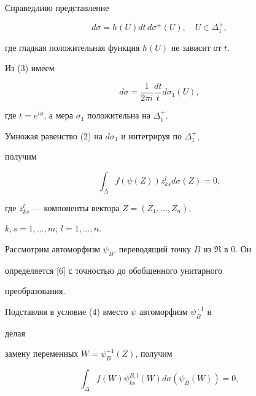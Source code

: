 \begin{lem} 


Справедливо представление 


\begin{equation} 


d\sigma=h(U)dt\,d\sigma^+(U),\quad U\in\Delta^+_1, 


\end{equation} 


где гладкая положительная функция $h(U)$ не зависит от $t$. 


\end{lem} 


 


Из (3) имеем 


$$ 


d\sigma=\frac{1}{2\pi i}\frac{dt}{t}d\sigma_1(U), 


$$ 


где $t=e^{i\phi}$, а мера $\sigma_1$ положительна на $\Delta^+_1$. 


Умножая равенство (2) на $d\sigma_1$ и интегрируя по $\Delta^+_1$, 


получим 


\begin{equation} 


\int_\Delta f(\psi(Z))z^l_{k s}d\sigma(Z)=0, 


\end{equation} 


где $z^l_{k s}$ --- компоненты вектора $Z=(Z_1,\dotsc,Z_n)$, 


$k,s=1,\dotsc,m$; $l=1,\dotsc,n$. 


 


Рассмотрим автоморфизм $\psi_B$, переводящий точку $B$ из $\Re$ в 0. Он 


определяется [6] с точностью до обобщенного унитарного 


преобразования. 


Подставляя в условие (4) вместо $\psi$ автоморфизм $\psi^{-1}_B$ и 


делая 


замену переменных $W=\psi^{-1}_B(Z)$, получим 


\begin{equation} 


\int_\Delta f(W)\psi^{B,l}_{k s}(W)d\sigma 


(\psi_B(W))=0, 


\end{equation} 


